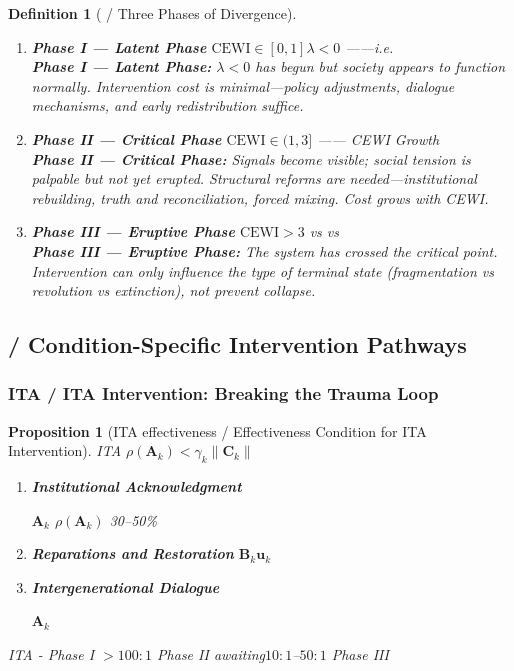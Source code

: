 \documentclass[11pt,a4paper]{article}
\newtheorem{proposition}[theorem]{Proposition}
\newtheorem{definition}[theorem]{Definition}
\theoremstyle{remark}
\newcommand{\lambdaparam}{\lambda}
\begin{document}
\begin{definition}[ / Three Phases of Divergence]
\label{def:phases}
\begin{enumerate}
    \item \textbf{Phase I — Latent Phase}
          $\text{CEWI} \in [0, 1]$$\lambdaparam < 0$ 
          ——i.e.
          \\[2pt]
          \textbf{Phase I — Latent Phase:} $\lambdaparam < 0$ has begun but society
          appears to function normally. Intervention cost is minimal—policy adjustments,
          dialogue mechanisms, and early redistribution suffice.

    \item \textbf{Phase II — Critical Phase}
          $\text{CEWI} \in (1, 3]$
          ——
           CEWI Growth
          \\[2pt]
          \textbf{Phase II — Critical Phase:} Signals become visible; social tension
          is palpable but not yet erupted. Structural reforms are needed—institutional
          rebuilding, truth and reconciliation, forced mixing. Cost grows with CEWI.

    \item \textbf{Phase III — Eruptive Phase}
          $\text{CEWI} > 3$\textit{}
           vs  vs 
          \\[2pt]
          \textbf{Phase III — Eruptive Phase:} The system has crossed the critical
          point. Intervention can only influence the \textit{type} of terminal state
          (fragmentation vs revolution vs extinction), not prevent collapse.
\end{enumerate}
\end{definition}

\subsection{ / Condition-Specific Intervention Pathways}

\subsubsection{ITA  / ITA Intervention: Breaking the Trauma Loop}

\begin{proposition}[ITA effectiveness / Effectiveness Condition for ITA Intervention]
\label{prop:ITA_intervention}
ITA  $\rho(\mathbf{A}_k) < \gamma_k \|\mathbf{C}_k\|$

\begin{enumerate}
    \item \textbf{Institutional Acknowledgment}
          
           $\mathbf{A}_k$ 
          $\rho(\mathbf{A}_k)$  30--50\%
    \item \textbf{Reparations and Restoration}
           $\mathbf{B}_k \mathbf{u}_k$ 
          
    \item \textbf{Intergenerational Dialogue}
          
           $\mathbf{A}_k$ 
\end{enumerate}
ITA - Phase I $>100:1$
 Phase II awaiting$10:1$--$50:1$ Phase III 
\end{proposition}
\end{document}
